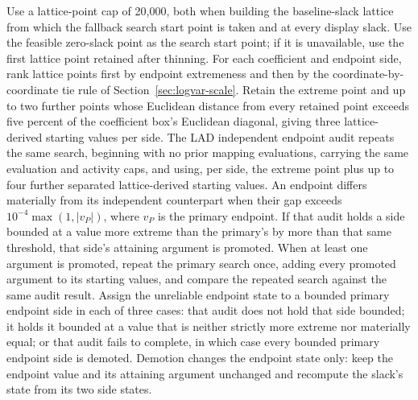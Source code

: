 \documentclass[11pt]{article}
\begin{document}
Use a lattice-point cap of 20,000, both when building the baseline-slack lattice from which the
fallback search start point is taken and at every display slack. Use
the feasible zero-slack point as the search start point; if it is unavailable, use the first
lattice point retained after thinning. For each coefficient and endpoint side, rank lattice points
first by endpoint extremeness and then by the coordinate-by-coordinate tie rule of
Section~\ref{sec:logvar-scale}. Retain the extreme point and up to two further
points whose Euclidean distance from every retained point exceeds five percent of the coefficient
box's Euclidean diagonal, giving three lattice-derived starting values per side.
The LAD independent endpoint audit repeats the same search, beginning with no prior mapping
evaluations, carrying the same evaluation and activity caps, and using, per side, the extreme point
plus up to four further separated lattice-derived starting values. An endpoint differs
materially from its independent counterpart when their gap exceeds
\(10^{-4}\max(1,|v_P|)\), where \(v_P\) is the primary endpoint. If that audit holds a side bounded
at a value more extreme than the primary's by more than that same threshold, that side's attaining
argument is promoted. When at least one argument is promoted, repeat the primary search once, adding
every promoted argument to its starting values, and compare the repeated search against the same
audit result. Assign the unreliable endpoint state to a bounded primary endpoint side in each of three
cases: that audit does not hold that side bounded; it holds it bounded at a value that is
neither strictly more extreme nor materially equal; or that audit fails to complete, in
which case every bounded primary endpoint side is demoted. Demotion changes the endpoint state only:
keep the endpoint value and its attaining argument unchanged and recompute the slack's state from
its two side states.
\end{document}
